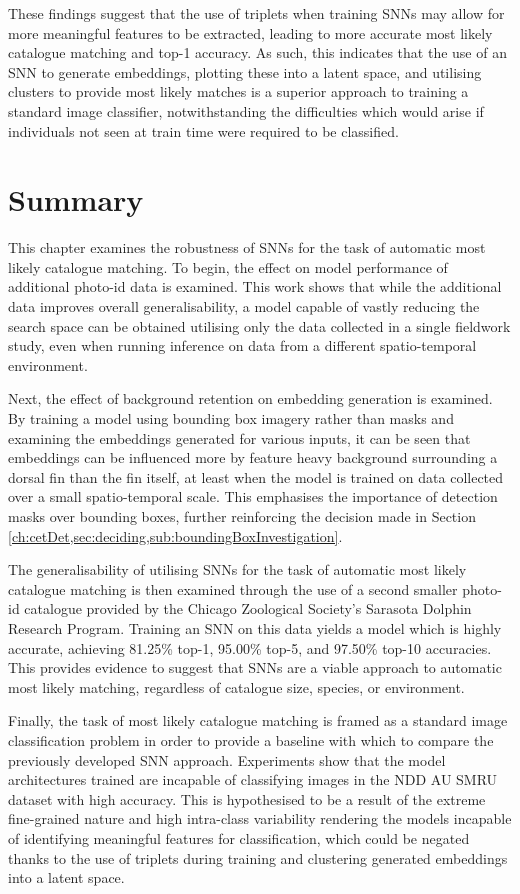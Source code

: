 These findings suggest that the use of triplets when training SNNs may allow for more meaningful features to be extracted, leading to more accurate most likely catalogue matching and top-1 accuracy. As such, this indicates that the use of an SNN to generate embeddings, plotting these into a latent space, and utilising clusters to provide most likely matches is a superior approach to training a standard image classifier, notwithstanding the difficulties which would arise if individuals not seen at train time were required to be classified.

\section{Summary}\label{ch:SNNEvaluation,sec:Summary}

This chapter examines the robustness of SNNs for the task of automatic most likely catalogue matching. To begin, the effect on model performance of additional photo-id data is examined. This work shows that while the additional data improves overall generalisability, a model capable of vastly reducing the search space can be obtained utilising only the data collected in a single fieldwork study, even when running inference on data from a different spatio-temporal environment.

Next, the effect of background retention on embedding generation is examined. By training a model using bounding box imagery rather than masks and examining the embeddings generated for various inputs, it can be seen that embeddings can be influenced more by feature heavy background surrounding a dorsal fin than the fin itself, at least when the model is trained on data collected over a small spatio-temporal scale. This emphasises the importance of detection masks over bounding boxes, further reinforcing the decision made in Section \ref{ch:cetDet,sec:deciding,sub:boundingBoxInvestigation}.

The generalisability of utilising SNNs for the task of automatic most likely catalogue matching is then examined through the use of a second smaller photo-id catalogue provided by the Chicago Zoological Society's Sarasota Dolphin Research Program. Training an SNN on this data yields a model which is highly accurate, achieving 81.25\% top-1, 95.00\% top-5, and 97.50\% top-10 accuracies. This provides evidence to suggest that SNNs are a viable approach to automatic most likely matching, regardless of catalogue size, species, or environment.

Finally, the task of most likely catalogue matching is framed as a standard image classification problem in order to provide a baseline with which to compare the previously developed SNN approach. Experiments show that the model architectures trained are incapable of classifying images in the NDD AU SMRU dataset with high accuracy. This is hypothesised to be a result of the extreme fine-grained nature and high intra-class variability rendering the models incapable of identifying meaningful features for classification, which could be negated thanks to the use of triplets during training and clustering generated embeddings into a latent space.

